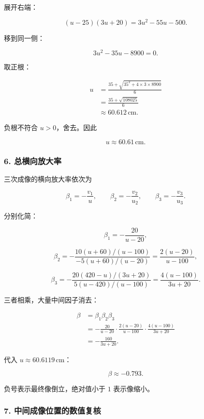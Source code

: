 \documentclass[12pt,a4paper,UTF8]{ctexart}
\begin{document}
展开右端：

\[
(u-25)(3u+20)=3u^2-55u-500.
\]

移到同一侧：

\[
3u^2-35u-8900=0.
\]

取正根：

\[
\begin{aligned}
u
&=\frac{35+\sqrt{35^2+4\times3\times8900}}{6}\\
&=\frac{35+\sqrt{108025}}{6}\\
&\approx60.612\,\mathrm{cm}.
\end{aligned}
\]

负根不符合 \(u>0\)，舍去。因此

\[
\boxed{u\approx60.61\,\mathrm{cm}}.
\]

\subsubsection{6.
总横向放大率}\label{ux603bux6a2aux5411ux653eux5927ux7387}

三次成像的横向放大率依次为

\[
\beta_1=-\frac{v_1}{u},
\qquad
\beta_2=-\frac{v_2}{u_2},
\qquad
\beta_3=-\frac{v_3}{u_3}.
\]

分别化简：

\[
\beta_1=-\frac{20}{u-20},
\]

\[
\beta_2
=-\frac{10(u+60)/(u-100)}{-5(u+60)/(u-20)}
=\frac{2(u-20)}{u-100},
\]

\[
\beta_3
=-\frac{20(420-u)/(3u+20)}{5(u-420)/(u-100)}
=\frac{4(u-100)}{3u+20}.
\]

三者相乘，大量中间因子消去：

\[
\begin{aligned}
\beta
&=\beta_1\beta_2\beta_3\\
&=-\frac{20}{u-20}
\cdot\frac{2(u-20)}{u-100}
\cdot\frac{4(u-100)}{3u+20}\\
&=-\frac{160}{3u+20}.
\end{aligned}
\]

代入 \(u\approx60.6119\,\mathrm{cm}\)：

\[
\boxed{\beta\approx-0.793}.
\]

负号表示最终像倒立，绝对值小于 \(1\) 表示像缩小。

\subsubsection{7.
中间成像位置的数值复核}\label{ux4e2dux95f4ux6210ux50cfux4f4dux7f6eux7684ux6570ux503cux590dux6838}
\end{document}
